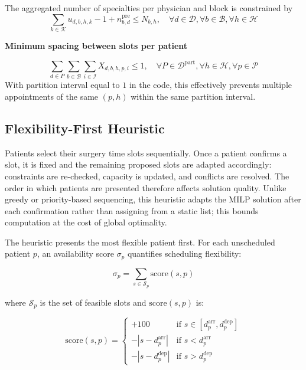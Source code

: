 The aggregated number of specialties per physician and block is constrained by
\begin{equation}
\sum_{k\in\mathcal{K}} u_{d,b,h,k} - 1 + n^{\text{pre}}_{b,d}\le N_{b,h},
 \quad \forall d\in\mathcal{D},\forall b\in\mathcal{B}, \forall h\in\mathcal{H}
\label{c:N-bh}
\end{equation}

\textbf{Minimum spacing between slots per patient}

\begin{equation}
\sum_{d\in P}\sum_{b\in\mathcal{B}}\sum_{i\in\mathcal{I}}
X_{d,b,h,p,i}
\le 1,\quad
\forall P\in\mathcal{D}^{\text{part}}, \forall h\in\mathcal{H}, \forall p\in\mathcal{P}
\label{c:spacing}
\end{equation}
With partition interval equal to $1$ in the code, this effectively prevents multiple appointments of the same $(p,h)$ within the same partition interval.

\subsection{Flexibility-First Heuristic}
\label{sec:patient_ordering}

Patients select their surgery time slots sequentially. Once a patient confirms a slot, it is fixed and the remaining proposed slots are adapted accordingly: constraints are re-checked, capacity is updated, and conflicts are resolved. The order in which patients are presented therefore affects solution quality. Unlike greedy or priority-based sequencing, this heuristic adapts the MILP solution after each confirmation rather than assigning from a static list; this bounds computation at the cost of global optimality.

The heuristic presents the most flexible patient first. For each unscheduled patient $p$, an availability score $\sigma_p$ quantifies scheduling flexibility:

\begin{equation}
\sigma_p = \sum_{s \in \mathcal{S}_p} \text{score}(s, p)
\end{equation}

where $\mathcal{S}_p$ is the set of feasible slots and $\text{score}(s, p)$ is:

\begin{equation}
\text{score}(s, p) = \begin{cases}
+100 & \text{if } s \in [d^{\text{arr}}_p, d^{\text{dep}}_p] \\
-|s - d^{\text{arr}}_p| & \text{if } s < d^{\text{arr}}_p \\
-|s - d^{\text{dep}}_p| & \text{if } s > d^{\text{dep}}_p
\end{cases}
\end{equation}

